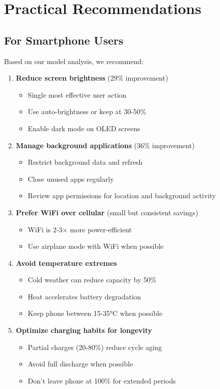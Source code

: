 \documentclass[12pt]{article}
\begin{document}
\section{Practical Recommendations}

\subsection{For Smartphone Users}

Based on our model analysis, we recommend:

\begin{enumerate}[label=\textbf{\arabic*.}]
    \item \textbf{Reduce screen brightness} (29\% improvement)
    \begin{itemize}
        \item Single most effective user action
        \item Use auto-brightness or keep at 30-50\%
        \item Enable dark mode on OLED screens
    \end{itemize}
    
    \item \textbf{Manage background applications} (36\% improvement)
    \begin{itemize}
        \item Restrict background data and refresh
        \item Close unused apps regularly
        \item Review app permissions for location and background activity
    \end{itemize}
    
    \item \textbf{Prefer WiFi over cellular} (small but consistent savings)
    \begin{itemize}
        \item WiFi is 2-3× more power-efficient
        \item Use airplane mode with WiFi when possible
    \end{itemize}
    
    \item \textbf{Avoid temperature extremes}
    \begin{itemize}
        \item Cold weather can reduce capacity by 50\%
        \item Heat accelerates battery degradation
        \item Keep phone between 15-35°C when possible
    \end{itemize}
    
    \item \textbf{Optimize charging habits for longevity}
    \begin{itemize}
        \item Partial charges (20-80\%) reduce cycle aging
        \item Avoid full discharge when possible
        \item Don't leave phone at 100\% for extended periods
    \end{itemize}
\end{enumerate}
\end{document}
